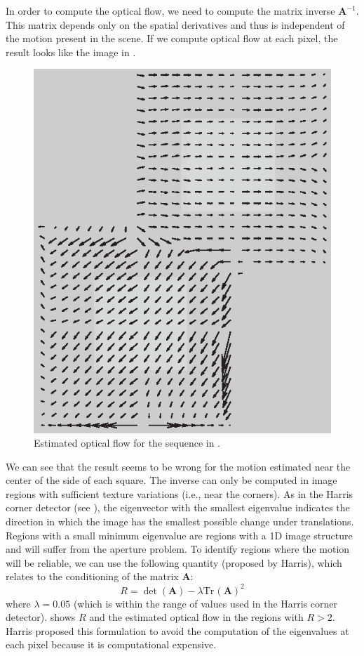 In order to compute the optical flow, we need to compute the matrix inverse $\mathbf{A}^{-1}$.  This matrix depends only on the spatial derivatives and thus is independent of the motion present in the scene. If we compute optical flow at each pixel, the result looks like the image in \fig{\ref{fig:square_grandient_based_5}}.
\vspace{-0.2in}
\begin{figure}[h!]
\centerline{
\includegraphics[width=.25\linewidth]{figures/optical_flow/square_grandient_based_5.eps}
}
\caption{Estimated optical flow for the sequence in \fig{\ref{fig:square_grandient_based_2}}.}
\label{fig:square_grandient_based_5}
\end{figure}
\vspace{-0.2in}

We can see that the result seems to be wrong for the motion estimated near the center of the side of each square. The inverse can only be computed in image regions with sufficient texture variations (i.e., near the corners). As in the Harris corner detector (see \sect{\ref{sec:finding_image_features}}), the  eigenvector with the smallest eigenvalue indicates the direction in which the image has the smallest possible change under translations. Regions with a small minimum eigenvalue are regions with a 1D image structure and will suffer from the aperture problem. To identify regions where the motion will be reliable, we can use the following quantity (proposed by Harris), which relates to the conditioning of the matrix $\mathbf{A}$: 
\begin{equation}
    R = \det (\mathbf{A}) - \lambda \mathrm{Tr}\hspace{1pt} (\mathbf{A})^2
\end{equation}
where $\lambda=0.05$ (which is within the range of values used in the Harris corner detector). \Fig{\ref{fig:square_grandient_based_4}} shows $R$ and the estimated optical flow in the regions with $R > 2$. Harris proposed this formulation to avoid the computation of the eigenvalues at each pixel because it is computational expensive. 

